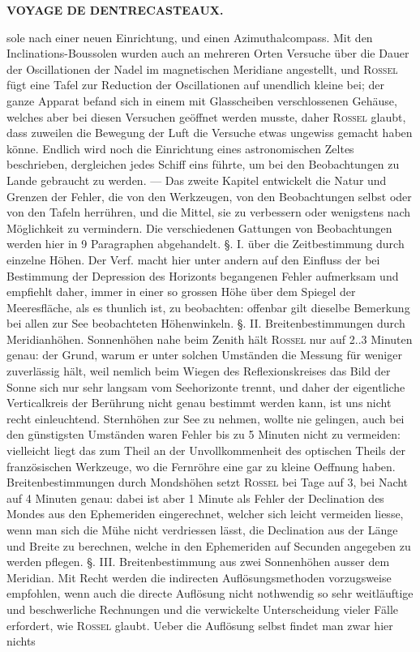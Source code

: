 \clearpage
\noindent{}%
\makebox[12mm][l]{}%
\parbox[t]{\dimexpr\linewidth-24mm\relax}{\centering\footnotesize\bfseries VOYAGE DE DENTRECASTEAUX.\par}%
\par\nobreak\medskip
\noindent sole nach einer neuen Einrichtung, und einen Azimuthalcompass. Mit den Inclinations-Boussolen wurden auch an mehreren Orten Versuche über die Dauer der Oscillationen der Nadel im magnetischen Meridiane angestellt, und \textsc{Rossel} fügt eine Tafel zur Reduction der Oscillationen auf unendlich kleine bei; der ganze Apparat befand sich in einem mit Glasscheiben verschlossenen Gehäuse, welches aber bei diesen Versuchen geöffnet werden musste, daher \textsc{Rossel} glaubt, dass zuweilen die Bewegung der Luft die Versuche etwas ungewiss gemacht haben könne. Endlich wird noch die Einrichtung eines astronomischen Zeltes beschrieben, dergleichen jedes Schiff eins führte, um bei den Beobachtungen zu Lande gebraucht zu werden. — Das zweite Kapitel entwickelt die Natur und Grenzen der Fehler, die von den Werkzeugen, von den Beobachtungen selbst oder von den Tafeln herrühren, und die Mittel, sie zu verbessern oder wenigstens nach Möglichkeit zu vermindern. Die verschiedenen Gattungen von Beobachtungen werden hier in 9 Paragraphen abgehandelt. §. I. über die Zeitbestimmung durch einzelne Höhen. Der Verf. macht hier unter andern auf den Einfluss der bei Bestimmung der Depression des Horizonts begangenen Fehler aufmerksam und empfiehlt daher, immer in einer so grossen Höhe über dem Spiegel der Meeresfläche, als es thunlich ist, zu beobachten: offenbar gilt dieselbe Bemerkung bei allen zur See beobachteten Höhenwinkeln. §. II. Breitenbestimmungen durch Meridianhöhen. Sonnenhöhen nahe beim Zenith hält \textsc{Rossel} nur auf 2..3 Minuten genau: der Grund, warum er unter solchen Umständen die Messung für weniger zuverlässig hält, weil nemlich beim Wiegen des Reflexionskreises das Bild der Sonne sich nur sehr langsam vom Seehorizonte trennt, und daher der eigentliche Verticalkreis der Berührung nicht genau bestimmt werden kann, ist uns nicht recht einleuchtend. Sternhöhen zur See zu nehmen, wollte nie gelingen, auch bei den günstigsten Umständen waren Fehler bis zu 5 Minuten nicht zu vermeiden: vielleicht liegt das zum Theil an der Unvollkommenheit des optischen Theils der französischen Werkzeuge, wo die Fernröhre eine gar zu kleine Oeffnung haben. Breitenbestimmungen durch Mondshöhen setzt \textsc{Rossel} bei Tage auf 3, bei Nacht auf 4 Minuten genau: dabei ist aber 1 Minute als Fehler der Declination des Mondes aus den Ephemeriden eingerechnet, welcher sich leicht vermeiden liesse, wenn man sich die Mühe nicht verdriessen lässt, die Declination aus der Länge und Breite zu berechnen, welche in den Ephemeriden auf Secunden angegeben zu werden pflegen. §. III. Breitenbestimmung aus zwei Sonnenhöhen ausser dem Meridian. Mit Recht werden die indirecten Auflösungsmethoden vorzugsweise empfohlen, wenn auch die directe Auflösung nicht nothwendig so sehr weitläuftige und beschwerliche Rechnungen und die verwickelte Unterscheidung vieler Fälle erfordert, wie \textsc{Rossel} glaubt. Ueber die Auflösung selbst findet man zwar hier nichts 